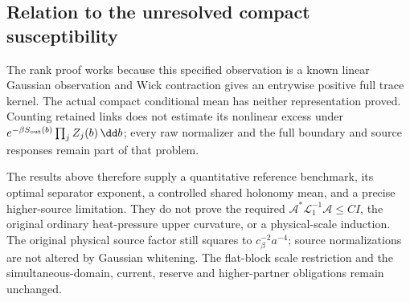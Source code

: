 \subsection{Relation to the unresolved compact susceptibility}

The rank proof works because this specified observation is a known linear
Gaussian observation and Wick contraction gives an entrywise positive full
trace kernel. The actual compact conditional mean has neither representation
proved. Counting retained links does not estimate its nonlinear excess under
\(e^{-\beta S_{\rm out}(b)}\prod_jZ_j(b)\,\dd b\); every raw normalizer and
the full boundary and source responses remain part of that problem.

The results above therefore supply a quantitative reference benchmark, its
optimal separator exponent, a controlled shared holonomy mean, and a precise
higher-source limitation. They do not prove the required
\(\mathcal A^*\mathcal L_1^{-1}\mathcal A\le CI\), the original ordinary
heat-pressure upper curvature, or a physical-scale induction. The original
physical source factor still squares to \(c_\beta^{-2}a^{-4}\); source
normalizations are not altered by Gaussian whitening. The flat-block scale
restriction and the simultaneous-domain, current, reserve and higher-partner
obligations remain unchanged.

